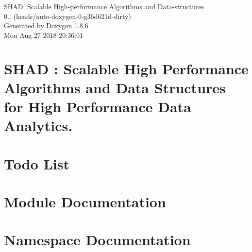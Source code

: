 \documentclass[twoside]{book}
\newcommand{\clearemptydoublepage}{%
  \newpage{\pagestyle{empty}\cleardoublepage}%
}
\begin{document}
\hypersetup{pageanchor=false}
\begin{titlepage}
\vspace*{7cm}
\begin{center}%
{\Large S\-H\-A\-D\-: Scalable High-\/performance Algorithms and Data-\/structures \\[1ex]\large 0.. (heads/auto-\/doxygen-\/0-\/g36d621d-\/dirty) }\\
\vspace*{1cm}
{\large Generated by Doxygen 1.8.6}\\
\vspace*{0.5cm}
{\small Mon Aug 27 2018 20:36:01}\\
\end{center}
\end{titlepage}
\clearemptydoublepage
\tableofcontents
\clearemptydoublepage
{}
\hypersetup{pageanchor=true}

\chapter{S\-H\-A\-D \-: Scalable High Performance Algorithms and Data Structures for High Performance Data Analytics.}
\label{index}\hypertarget{index}{}
\chapter{Todo List}
\label{todo}
\hypertarget{todo}{}

\chapter{Module Documentation}










\chapter{Namespace Documentation}


\end{document}
